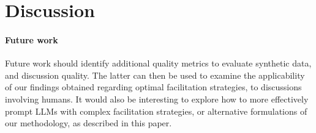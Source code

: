 %
\section{Discussion}
\paragraph{Future work}Future work should identify additional quality metrics to evaluate synthetic data, and discussion quality. The latter can then be used to examine the applicability of our findings obtained regarding optimal facilitation strategies, to discussions involving humans. It would also be interesting to explore how to more effectively prompt LLMs with complex facilitation strategies, or alternative formulations of our methodology, as described in this paper.